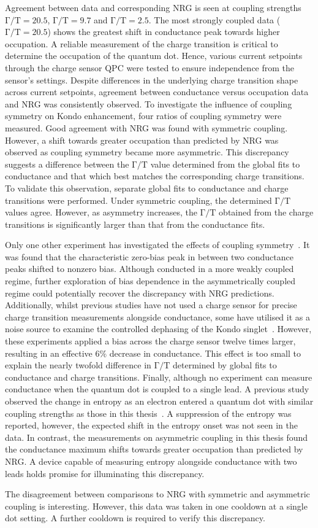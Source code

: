 Agreement between data and corresponding NRG is seen at coupling strengths $\mathrm{\Gamma/T} = 20.5$, $\mathrm{\Gamma/T} = 9.7$ and $\mathrm{\Gamma/T} = 2.5$. The most strongly coupled data ($\mathrm{\Gamma/T} = 20.5$) shows the greatest shift in conductance peak towards higher occupation. 
A reliable measurement of the charge transition is critical to determine the occupation of the quantum dot. 
Hence, various current setpoints through the charge sensor QPC were tested to ensure independence from the sensor's settings.
Despite differences in the underlying charge transition shape across current setpoints, agreement between conductance versus occupation data and NRG was consistently observed.
To investigate the influence of coupling symmetry on Kondo enhancement, four ratios of coupling symmetry were measured.
Good agreement with NRG was found with symmetric coupling. 
However, a shift towards greater occupation than predicted by NRG was observed as coupling symmetry became more asymmetric.
This discrepancy suggests a difference between the $\mathrm{\Gamma/T}$ value determined from the global fits to conductance and that which best matches the corresponding charge transitions. 
To validate this observation, separate global fits to conductance and charge transitions were performed. Under symmetric coupling, the determined $\mathrm{\Gamma/T}$ values agree. However, as asymmetry increases, the $\mathrm{\Gamma/T}$ obtained from the charge transitions is significantly larger than that from the conductance fits.

Only one other experiment has investigated the effects of coupling symmetry~\cite{kondo_asymmetric}. 
It was found that the characteristic zero-bias peak in between two conductance peaks shifted to nonzero bias. 
Although conducted in a more weakly coupled regime, further exploration of bias dependence in the asymmetrically coupled regime could potentially recover the discrepancy with NRG predictions. 
Additionally, whilst previous studies have not used a charge sensor for precise charge transition measurements alongside conductance, some have utilised it as a noise source to examine the controlled dephasing of the Kondo singlet~\cite{kondo_controlled_dephasing}. 
However, these experiments applied a bias across the charge sensor twelve times larger, resulting in an effective $6\%$ decrease in conductance. 
This effect is too small to explain the nearly twofold difference in $\mathrm{\Gamma/T}$ determined by global fits to conductance and charge transitions.
Finally, although no experiment can measure conductance when the quantum dot is coupled to a single lead. 
A previous study observed the change in entropy as an electron entered a quantum dot with similar coupling strengths as those in this thesis~\cite{child_strong}. 
A suppression of the entropy was reported, however, the expected shift in the entropy onset was not seen in the data. 
In contrast, the measurements on asymmetric coupling in this thesis found the conductance maximum shifts towards greater occupation than predicted by NRG.
A device capable of measuring entropy alongside conductance with two leads holds promise for illuminating this discrepancy.


The disagreement between comparisons to NRG with symmetric and asymmetric coupling is interesting. However, this data was taken in one cooldown at a single dot setting. A further cooldown is required to verify this discrepancy.